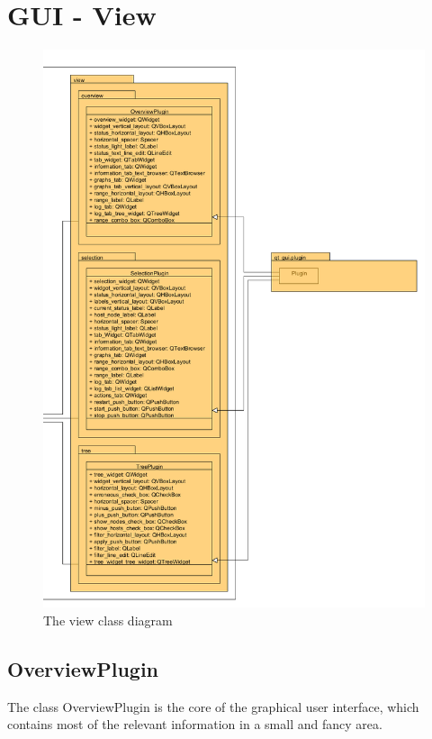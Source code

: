 \newpage
\section{GUI - View}
\begin{figure}[!ht]
\begin{center}
\includegraphics[width=0.8\linewidth]{./bilder/view.png}
\caption{The view class diagram}
\end{center}
\end{figure}

\subsection{OverviewPlugin}
The class OverviewPlugin is the core of the graphical user interface, which
contains most of the relevant information in a small and fancy area.

